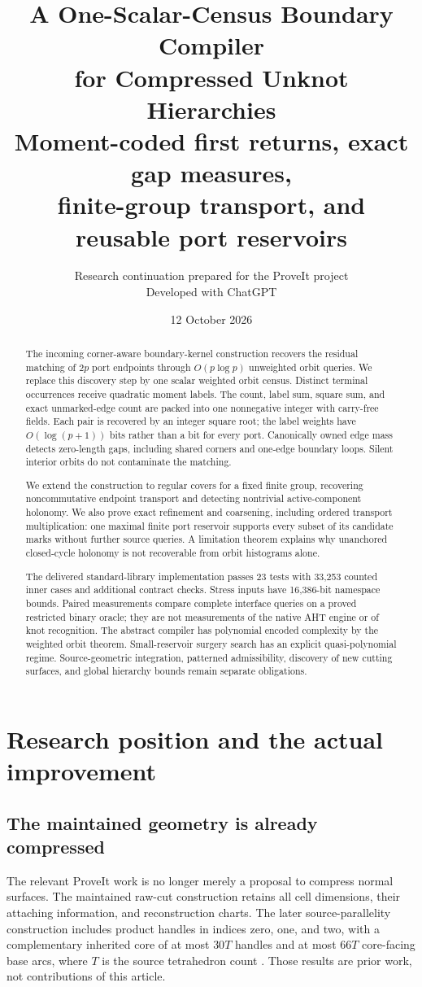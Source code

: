 \documentclass[11pt]{article}
\title{\textbf{A One-Scalar-Census Boundary Compiler\\for Compressed Unknot Hierarchies}\\[7pt]
\large Moment-coded first returns, exact gap measures,\\finite-group transport, and reusable port reservoirs}
\author{Research continuation prepared for the ProveIt project\\Developed with ChatGPT}
\date{12 October 2026}
\theoremstyle{definition}\newtheorem{definition}[theorem]{Definition}\newtheorem{example}[theorem]{Example}
\theoremstyle{remark}\newtheorem{remark}[theorem]{Remark}
\begin{document}
\maketitle
\begin{abstract}
The incoming corner-aware boundary-kernel construction recovers the residual matching of $2p$ port endpoints through $O(p\log p)$ unweighted orbit queries. We replace this discovery step by one scalar weighted orbit census. Distinct terminal occurrences receive quadratic moment labels. The count, label sum, square sum, and exact unmarked-edge count are packed into one nonnegative integer with carry-free fields. Each pair is recovered by an integer square root; the label weights have $O(\log(p+1))$ bits rather than a bit for every port. Canonically owned edge mass detects zero-length gaps, including shared corners and one-edge boundary loops. Silent interior orbits do not contaminate the matching.

We extend the construction to regular covers for a fixed finite group, recovering noncommutative endpoint transport and detecting nontrivial active-component holonomy. We also prove exact refinement and coarsening, including ordered transport multiplication: one maximal finite port reservoir supports every subset of its candidate marks without further source queries. A limitation theorem explains why unanchored closed-cycle holonomy is not recoverable from orbit histograms alone.

The delivered standard-library implementation passes 23 tests with 33,253 counted inner cases and additional contract checks. Stress inputs have 16,386-bit namespace bounds. Paired measurements compare complete interface queries on a proved restricted binary oracle; they are not measurements of the native AHT engine or of knot recognition. The abstract compiler has polynomial encoded complexity by the weighted orbit theorem. Small-reservoir surgery search has an explicit quasi-polynomial regime. Source-geometric integration, patterned admissibility, discovery of new cutting surfaces, and global hierarchy bounds remain separate obligations.
\end{abstract}
\newpage
{\small\setlength{\parskip}{0pt}\tableofcontents}
\newpage

\section{Research position and the actual improvement}
\label{sec:position}
\subsection{The maintained geometry is already compressed}
The relevant ProveIt work is no longer merely a proposal to compress normal surfaces. The maintained raw-cut construction retains all cell dimensions, their attaching information, and reconstruction charts. The later source-parallelity construction includes product handles in indices zero, one, and two, with a complementary inherited core of at most $30T$ handles and at most $66T$ core-facing base arcs, where $T$ is the source tetrahedron count \cite{rawcut,parallelity}. Those results are prior work, not contributions of this article.
\end{document}

